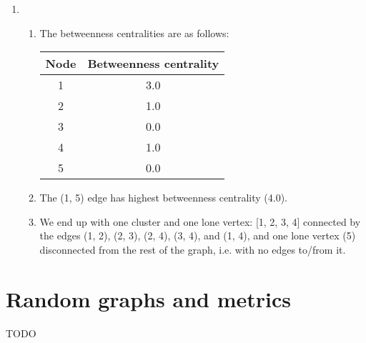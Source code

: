 \documentclass[12pt]{article}
\begin{document}
\begin{enumerate}
    \item \begin{enumerate}
        \item The betweenness centralities are as follows:\\
            \begin{tabular}{|c|c|}
                \hline
                \textbf{Node} & \textbf{Betweenness centrality}\\
                \hline
                1 & 3.0 \\
                2 & 1.0 \\
                3 & 0.0 \\
                4 & 1.0 \\
                5 & 0.0 \\
                \hline
            \end{tabular}
        \item The (1, 5) edge has highest betweenness centrality (4.0).
        \item We end up with one cluster and one lone vertex: [1, 2, 3, 4] connected by the edges (1, 2), (2, 3), (2, 4), (3, 4), and (1, 4), and one lone vertex (5) disconnected from the rest of the graph, i.e. with no edges to/from it.
    \end{enumerate}
\end{enumerate}

\section*{Random graphs and metrics}
TODO
\end{document}
